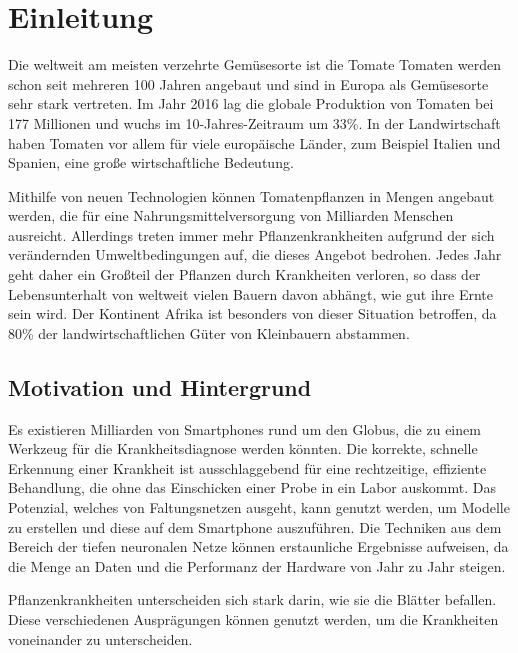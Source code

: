 \chapter{Einleitung}
Die weltweit am meisten verzehrte Gemüsesorte ist die Tomate\cite{FreshPlaza} Tomaten werden schon seit mehreren 100 Jahren angebaut und sind in Europa als Gemüsesorte sehr stark vertreten. Im Jahr 2016 lag die globale Produktion von Tomaten bei 177 Millionen und wuchs im 10-Jahres-Zeitraum um 33\%. In der Landwirtschaft haben Tomaten vor allem für viele europäische Länder, zum Beispiel Italien und Spanien, eine große wirtschaftliche Bedeutung. 

Mithilfe von neuen Technologien können Tomatenpflanzen in Mengen angebaut werden, die für eine Nahrungsmittelversorgung von Milliarden Menschen ausreicht. Allerdings treten immer mehr Pflanzenkrankheiten aufgrund der sich verändernden Umweltbedingungen auf, die dieses Angebot bedrohen. Jedes Jahr geht daher ein Großteil der Pflanzen durch Krankheiten verloren, so dass der Lebensunterhalt von weltweit vielen Bauern davon abhängt, wie gut ihre Ernte sein wird. Der Kontinent Afrika ist besonders von dieser Situation betroffen, da 80\% der landwirtschaftlichen Güter von Kleinbauern abstammen\cite{crowdai}.



\section{Motivation und Hintergrund}

Es existieren Milliarden von Smartphones rund um den Globus, die zu einem Werkzeug für die Krankheitsdiagnose werden könnten\cite{crowdai}. Die korrekte, schnelle Erkennung einer Krankheit ist ausschlaggebend für eine rechtzeitige, effiziente Behandlung, die ohne das Einschicken einer Probe in ein Labor auskommt. Das Potenzial, welches von Faltungsnetzen ausgeht, kann genutzt werden, um Modelle zu erstellen und diese auf dem Smartphone auszuführen. Die Techniken aus dem Bereich der tiefen neuronalen Netze können erstaunliche Ergebnisse aufweisen, da die Menge an Daten und die Performanz der Hardware von Jahr zu Jahr steigen.

Pflanzenkrankheiten unterscheiden sich stark darin, wie sie die Blätter befallen. Diese verschiedenen Ausprägungen können genutzt werden, um die Krankheiten voneinander zu unterscheiden.




